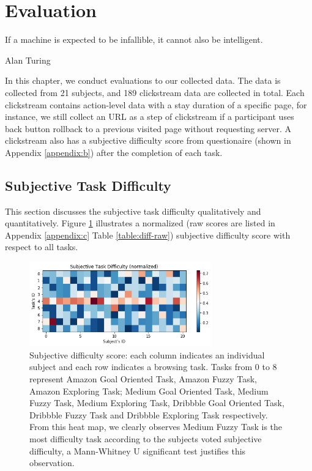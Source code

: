 \section{Evaluation}
\label{ch:eval}

\epigraph{If a machine is expected to be infallible, it cannot also be intelligent.}{Alan Turing}

In this chapter, we conduct evaluations to our collected data.
The data is collected from 21 subjects, and 189 clickstream data are collected in total. 
Each clickstream contains action-level data with a stay duration
of a specific page, for instance, we still collect an URL as a step of clickstream 
if a participant uses back button rollback to a previous visited page without requesting server. 
A clickstream also has a subjective difficulty score from questionaire (shown in Appendix \ref{appendix:b}) 
after the completion of each task.

\subsection{Subjective Task Difficulty}
\label{sec:task-diff}

This section discusses the subjective task difficulty qualitatively and quantitatively.
Figure \ref{fig:difficulty} illustrates a normalized (raw scores are listed in 
Appendix \ref{appendix:c} Table \ref{table:diff-raw}) subjective difficulty score 
with respect to all tasks.

\begin{figure}[H]
    \centering
    \includegraphics[width=0.7\textwidth]{figures/difficulty}
    \caption{Subjective difficulty score: each column indicates an individual subject and
    each row indicates a browsing task. Tasks from 0 to 8 represent Amazon Goal Oriented Task,
    Amazon Fuzzy Task, Amazon Exploring Task; Medium Goal Oriented Task, Medium Fuzzy Task,
    Medium Exploring Task, Dribbble Goal Oriented Task, Dribbble Fuzzy Task and Dribbble Exploring Task
    respectively.
    From this heat map, we clearly observes Medium Fuzzy Task is the most difficulty task
    according to the subjects voted subjective difficulty, a Mann-Whitney U significant 
    test justifies this observation.}
    \label{fig:difficulty}
\end{figure}

